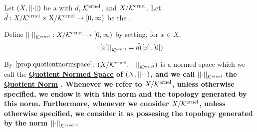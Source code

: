 \label{def:quotientnormspace}
\newcommand{\QuotientNorm}[0]{
    \bf \hyperref[def:quotientnormspace]{Quotient Norm} \rm
}
\newcommand{\QuotientNormedSpace}[0]{
    \bf \hyperref[def:quotientnormspace]{Quotient Normed Space} \rm
}

\begin{df}
Let $(X,\left|\left| \cdot \right|\right|)$ be a \SeminormedSpace
with \SeminormInducedPseudometric $d$, 
\SeminormKernel $\bf\mathcal{K}\rm^{ernel}$, and
\SeminormKernelQuotientVectorSpace $X/\bf\mathcal{K}\rm^{ernel}$.
Let $\tilde{d}:X/\bf\mathcal{K}\rm^{ernel} \times X/\bf\mathcal{K}\rm^{ernel} \to [0,\infty)$ be the \MetricInducedByPseudometric.

Define $\left|\left| \cdot \right|\right|_{\bf\mathcal{K}\rm^{ernel}} : X/\bf\mathcal{K}\rm^{ernel} \to [0,\infty)$ by setting, 
for $x \in X$, 
\begin{equation}
\left|\left| [x] \right|\right|_{\bf\mathcal{K}\rm^{ernel}} = \tilde{d}([x], [0])
\end{equation}

By $\ref{prop:quotientnormspace}$, $(X/\bf\mathcal{K}\rm^{ernel}, \left|\left| \cdot \right|\right|_{\bf\mathcal{K}\rm^{ernel}})$ is a normed space which we call the \QuotientNormedSpace of $(X,\left|\left| \cdot \right|\right|)$, and we call $\left|\left| \cdot \right|\right|_{\bf\mathcal{K}\rm^{ernel}}$ the \QuotientNorm. 
Whenever we refer to $X/\bf\mathcal{K}\rm^{ernel}$, unless otherwise specified, we endow it with this norm and the topology generated by this norm.
Furthermore, whenever we consider $X/\bf\mathcal{K}\rm^{ernel}$, unless otherwise specified, we consider it as 
possesing the topology generated by the norm $\left|\left| \cdot \right|\right|_{\bf\mathcal{K}\rm^{ernel}}$. 
\end{df}
